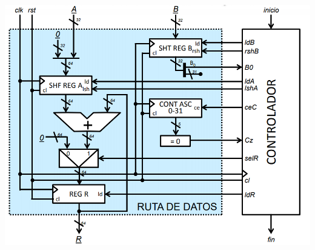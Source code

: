 \documentclass[a4paper,10pt]{book}
\begin{document}
\begin{center}
\includegraphics[scale=0.6]{final ruta de datos}
\end{center}
\end{document}
